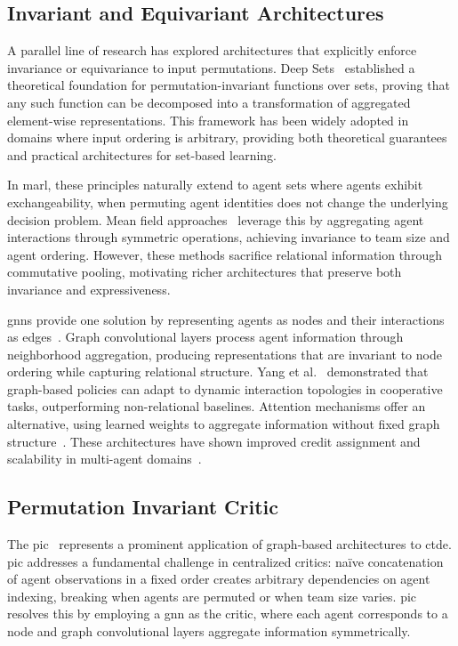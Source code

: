 \documentclass[conference]{IEEEtran}
\begin{document}
\subsection{Invariant and Equivariant Architectures}

A parallel line of research has explored architectures that explicitly 
enforce invariance or equivariance to input permutations. 
Deep Sets~\cite{zaheer2017} established a theoretical foundation for 
permutation-invariant functions over sets, proving that any such function 
can be decomposed into a transformation of aggregated element-wise representations. 
This framework has been widely adopted in domains where input ordering is arbitrary, 
providing both theoretical guarantees and practical architectures for set-based learning.

In \gls{marl}, these principles naturally extend to agent sets where 
agents exhibit exchangeability, when permuting agent identities does 
not change the underlying decision problem. 
Mean field approaches~\cite{yang2018, li2021b} leverage this by 
aggregating agent interactions through symmetric operations, 
achieving invariance to team size and agent ordering. 
However, these methods sacrifice relational information through commutative pooling, 
motivating richer architectures that preserve both invariance and expressiveness.

\Glspl{gnn} provide one solution by representing agents as nodes and their 
interactions as edges~\cite{yang2021a}. Graph convolutional layers process agent 
information through neighborhood aggregation, producing representations that are 
invariant to node ordering while capturing relational structure. 
Yang et al.~\cite{yang2021a} demonstrated that graph-based policies can adapt to 
dynamic interaction topologies in cooperative tasks, outperforming non-relational baselines. 
Attention mechanisms offer an alternative, using learned weights to aggregate 
information without fixed graph structure~\cite{zambaldi2018, tang2021}. 
These architectures have shown improved credit assignment and scalability in 
multi-agent domains~\cite{hao2023}.

\subsection{Permutation Invariant Critic}

The \gls{pic}~\cite{liu2020b} represents a 
prominent application of graph-based architectures to \gls{ctde}. 
\Gls{pic} addresses a fundamental challenge in centralized critics: na\"ive 
concatenation of agent observations in a fixed order creates arbitrary 
dependencies on agent indexing, breaking when agents are permuted or 
when team size varies. \Gls{pic} resolves this by employing a \gls{gnn} as the critic, 
where each agent corresponds to a node and graph 
convolutional layers aggregate information symmetrically.
\end{document}

